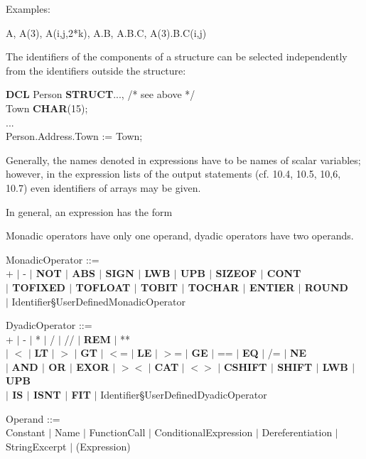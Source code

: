 Examples:

A, A(3), A(i,j,2*k), A.B, A.B.C, A(3).B.C(i,j)

The identifiers of the components of a structure can be selected
independently from the identifiers outside the structure:

{\bf DCL} Person {\bf STRUCT}..., /* see above */ \\
\x Town {\bf CHAR}(15);\\
\x ...\\
Person.Address.Town := Town;

Generally, the names denoted in expressions have to be names of scalar
variables; however, in the expression lists of the output statements
(cf. 10.4, 10.5, 10,6, 10.7) even identifiers of arrays may be given.

In general, an expression has the form



Monadic operators have only one operand, dyadic operators have two
operands.

\begin{front}
MonadicOperator ::=\\
\x + $\mid$ - {\bf $\mid$ NOT $\mid$ ABS $\mid$ SIGN $\mid$ LWB $\mid$ UPB $\mid$ SIZEOF $\mid$ CONT \\
\x $\mid$ TOFIXED $\mid$ TOFLOAT $\mid$ TOBIT $\mid$ TOCHAR $\mid$ ENTIER $\mid$ ROUND} \\
\x $\mid$ Identifier\S UserDefinedMonadicOperator

DyadicOperator ::=\\
\x + $\mid$ - $\mid$ * $\mid$ / $\mid$ // $\mid$ {\bf REM} $\mid$ ** \\
\x $\mid$ $<$ $\mid$ {\bf LT} $\mid$ $>$ $\mid$ {\bf GT} $\mid$ $<$= $\mid$ {\bf LE} $\mid$ $>$= $\mid$ {\bf GE} $\mid$ == $\mid$ {\bf EQ} $\mid$ /= $\mid$ {\bf NE} \\
\x $\mid$ {\bf AND $\mid$ OR $\mid$ EXOR} $\mid$ $><$ $\mid$ {\bf CAT} $\mid$ $<>$ $\mid$ {\bf CSHIFT $\mid$ SHIFT $\mid$ LWB $\mid$ UPB \\
\x $\mid$ IS $\mid$ ISNT $\mid$ FIT} \x $\mid$ Identifier\S UserDefinedDyadicOperator

Operand ::=\\
\x Constant $\mid$ Name $\mid$ FunctionCall $\mid$ ConditionalExpression $\mid$ Dereferentiation $\mid$\\
\x StringExcerpt $\mid$ (Expression)
\end{front}
\begin{grammar}




\end{grammar}

